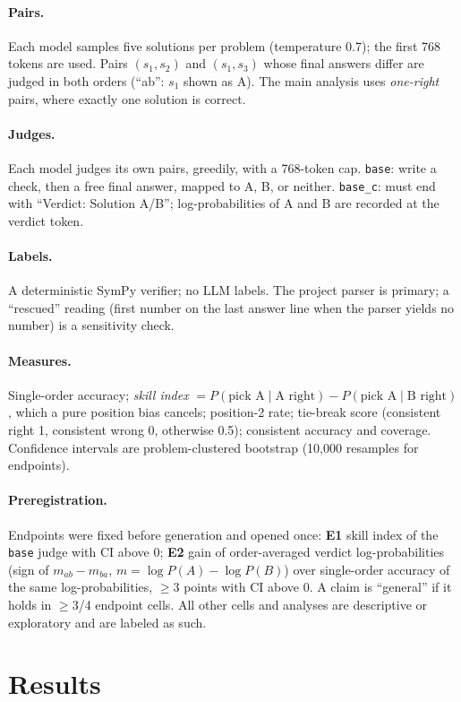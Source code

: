 \documentclass[11pt]{article}
\begin{document}
\paragraph{Pairs.} Each model samples five solutions per problem (temperature 0.7); the first 768 tokens are
used. Pairs $(s_1,s_2)$ and $(s_1,s_3)$ whose final answers differ are judged in both orders (``ab'': $s_1$
shown as A). The main analysis uses \emph{one-right} pairs, where exactly one solution is correct.
\paragraph{Judges.} Each model judges its own pairs, greedily, with a 768-token cap. \texttt{base}: write a
check, then a free final answer, mapped to A, B, or neither. \texttt{base\_c}: must end with
``Verdict: Solution A/B''; log-probabilities of A and B are recorded at the verdict token.
\paragraph{Labels.} A deterministic SymPy verifier; no LLM labels. The project parser is primary; a
``rescued'' reading (first number on the last answer line when the parser yields no number) is a sensitivity
check.
\paragraph{Measures.} Single-order accuracy; \emph{skill index} $=P(\text{pick A}\mid\text{A right})-
P(\text{pick A}\mid\text{B right})$, which a pure position bias cancels; position-2 rate; tie-break score
(consistent right 1, consistent wrong 0, otherwise 0.5); consistent accuracy and coverage. Confidence intervals
are problem-clustered bootstrap (10{,}000 resamples for endpoints).
\paragraph{Preregistration.} Endpoints were fixed before generation and opened once: \textbf{E1} skill index of
the \texttt{base} judge with CI above 0; \textbf{E2} gain of order-averaged verdict log-probabilities
(sign of $m_{ab}-m_{ba}$, $m=\log P(A)-\log P(B)$) over single-order accuracy of the same log-probabilities,
$\geq$3 points with CI above 0. A claim is ``general'' if it holds in $\geq$3/4 endpoint cells. All other
cells and analyses are descriptive or exploratory and are labeled as such.

\section{Results}
\end{document}
